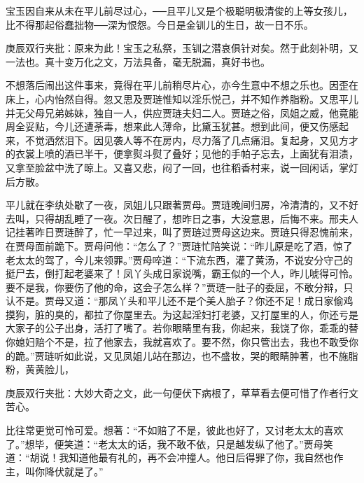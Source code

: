 \begin{parag}


    宝玉因自来从未在平儿前尽过心，──且平儿又是个极聪明极清俊的上等女孩儿，比不得那起俗蠢拙物──深为恨怨。今日是金钏儿的生日，故一日不乐。\begin{note}庚辰双行夹批：原来为此！宝玉之私祭，玉钏之潜哀俱针对矣。然于此刻补明，又一法也。真十变万化之文，万法具备，毫无脱漏，真好书也。\end{note}不想落后闹出这件事来，竟得在平儿前稍尽片心，亦今生意中不想之乐也。因歪在床上，心内怡然自得。忽又思及贾琏惟知以淫乐悦己，并不知作养脂粉。又思平儿并无父母兄弟姊妹，独自一人，供应贾琏夫妇二人。贾琏之俗，凤姐之威，他竟能周全妥贴，今儿还遭荼毒，想来此人薄命，比黛玉犹甚。想到此间，便又伤感起来，不觉洒然泪下。因见袭人等不在房内，尽力落了几点痛泪。复起身，又见方才的衣裳上喷的酒已半干，便拿熨斗熨了叠好；见他的手帕子忘去，上面犹有泪渍，又拿至脸盆中洗了晾上。又喜又悲，闷了一回，也往稻香村来，说一回闲话，掌灯后方散。
\end{parag}


\begin{parag}


    平儿就在李纨处歇了一夜，凤姐儿只跟著贾母。贾琏晚间归房，冷清清的，又不好去叫，只得胡乱睡了一夜。次日醒了，想昨日之事，大没意思，后悔不来。邢夫人记挂著昨日贾琏醉了，忙一早过来，叫了贾琏过贾母这边来。贾琏只得忍愧前来，在贾母面前跪下。贾母问他：“怎么了？”贾琏忙陪笑说：“昨儿原是吃了酒，惊了老太太的驾了，今儿来领罪。”贾母啐道：“下流东西，灌了黄汤，不说安分守己的挺尸去，倒打起老婆来了！凤丫头成日家说嘴，霸王似的一个人，昨儿唬得可怜。要不是我，你要伤了他的命，这会子怎么样？”贾琏一肚子的委屈，不敢分辩，只认不是。贾母又道：“那凤丫头和平儿还不是个美人胎子？你还不足！成日家偷鸡摸狗，脏的臭的，都拉了你屋里去。为这起淫妇打老婆，又打屋里的人，你还亏是大家子的公子出身，活打了嘴了。若你眼睛里有我，你起来，我饶了你，乖乖的替你媳妇赔个不是，拉了他家去，我就喜欢了。要不然，你只管出去，我也不敢受你的跪。”贾琏听如此说，又见凤姐儿站在那边，也不盛妆，哭的眼睛肿著，也不施脂粉，黄黄脸儿，\begin{note}庚辰双行夹批：大妙大奇之文，此一句便伏下病根了，草草看去便可惜了作者行文苦心。\end{note}比往常更觉可怜可爱。想著：“不如赔了不是，彼此也好了，又讨老太太的喜欢了。”想毕，便笑道：“老太太的话，我不敢不依，只是越发纵了他了。”贾母笑道：“胡说！我知道他最有礼的，再不会冲撞人。他日后得罪了你，我自然也作主，叫你降伏就是了。”
\end{parag}


